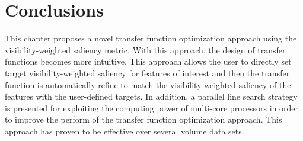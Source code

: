 %
%

\section{Conclusions}
This chapter proposes a novel transfer function optimization approach using the visibility-weighted saliency metric.
With this approach, the design of transfer functions becomes more intuitive. This approach allows the user to directly set target visibility-weighted saliency for features of interest and then the transfer function is automatically refine to match the visibility-weighted saliency of the features with the user-defined targets. In addition, a parallel line search strategy is presented for exploiting the computing power of multi-core processors in order to improve the perform of the transfer function optimization approach.
This approach has proven to be effective over several volume data sets.
